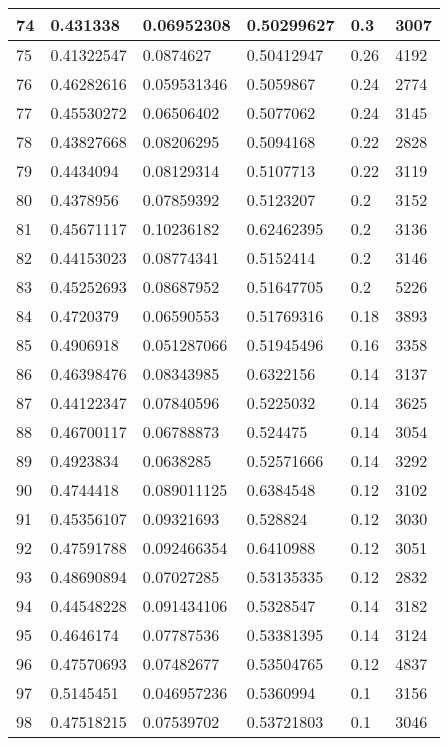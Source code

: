 \begin{longtable}{|l|l|l|l|l|l|}
74 & 0.431338 & 0.06952308 & 0.50299627 & 0.3 & 3007 \\ \hline 
75 & 0.41322547 & 0.0874627 & 0.50412947 & 0.26 & 4192 \\ \hline 
76 & 0.46282616 & 0.059531346 & 0.5059867 & 0.24 & 2774 \\ \hline 
77 & 0.45530272 & 0.06506402 & 0.5077062 & 0.24 & 3145 \\ \hline 
78 & 0.43827668 & 0.08206295 & 0.5094168 & 0.22 & 2828 \\ \hline 
79 & 0.4434094 & 0.08129314 & 0.5107713 & 0.22 & 3119 \\ \hline 
80 & 0.4378956 & 0.07859392 & 0.5123207 & 0.2 & 3152 \\ \hline 
81 & 0.45671117 & 0.10236182 & 0.62462395 & 0.2 & 3136 \\ \hline 
82 & 0.44153023 & 0.08774341 & 0.5152414 & 0.2 & 3146 \\ \hline 
83 & 0.45252693 & 0.08687952 & 0.51647705 & 0.2 & 5226 \\ \hline 
84 & 0.4720379 & 0.06590553 & 0.51769316 & 0.18 & 3893 \\ \hline 
85 & 0.4906918 & 0.051287066 & 0.51945496 & 0.16 & 3358 \\ \hline 
86 & 0.46398476 & 0.08343985 & 0.6322156 & 0.14 & 3137 \\ \hline 
87 & 0.44122347 & 0.07840596 & 0.5225032 & 0.14 & 3625 \\ \hline 
88 & 0.46700117 & 0.06788873 & 0.524475 & 0.14 & 3054 \\ \hline 
89 & 0.4923834 & 0.0638285 & 0.52571666 & 0.14 & 3292 \\ \hline 
90 & 0.4744418 & 0.089011125 & 0.6384548 & 0.12 & 3102 \\ \hline 
91 & 0.45356107 & 0.09321693 & 0.528824 & 0.12 & 3030 \\ \hline 
92 & 0.47591788 & 0.092466354 & 0.6410988 & 0.12 & 3051 \\ \hline 
93 & 0.48690894 & 0.07027285 & 0.53135335 & 0.12 & 2832 \\ \hline 
94 & 0.44548228 & 0.091434106 & 0.5328547 & 0.14 & 3182 \\ \hline 
95 & 0.4646174 & 0.07787536 & 0.53381395 & 0.14 & 3124 \\ \hline 
96 & 0.47570693 & 0.07482677 & 0.53504765 & 0.12 & 4837 \\ \hline 
97 & 0.5145451 & 0.046957236 & 0.5360994 & 0.1 & 3156 \\ \hline 
98 & 0.47518215 & 0.07539702 & 0.53721803 & 0.1 & 3046 \\ \hline 

\end{longtable}
